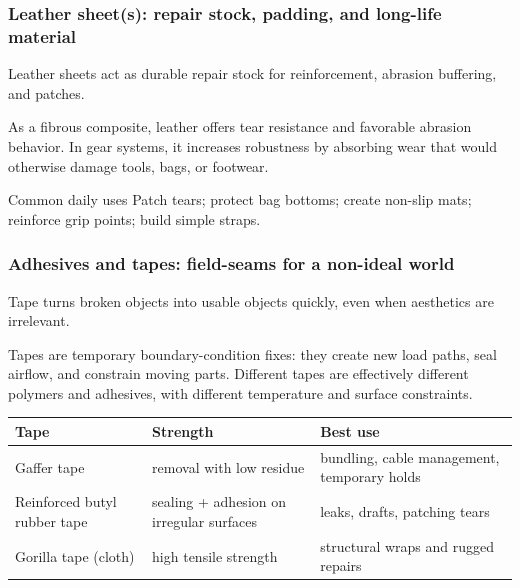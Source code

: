 \begin{frame}[t]
  \frametitle{Leather sheet(s): repair stock, padding, and long-life material}
  \justifying
   Leather sheets act as durable repair stock for reinforcement, abrasion buffering, and patches.

  \vspace{0.5em}
   As a fibrous composite, leather offers tear resistance and favorable abrasion behavior. In gear systems, it increases robustness by absorbing wear that would otherwise damage tools, bags, or footwear.

  \vspace{0.8em}
  \begin{block}{Common daily uses}
    Patch tears; protect bag bottoms; create non-slip mats; reinforce grip points; build simple straps.
  \end{block}
\end{frame}

\begin{frame}[t,shrink=2]
  \frametitle{Adhesives and tapes: field-seams for a non-ideal world}
  \justifying
   Tape turns broken objects into usable objects quickly, even when aesthetics are irrelevant.

  \vspace{0.5em}
   Tapes are temporary boundary-condition fixes: they create new load paths, seal airflow, and constrain moving parts. Different tapes are effectively different polymers and adhesives, with different temperature and surface constraints.

  \vspace{0.8em}
  \TableBodySize
  \begin{table}
    \centering
    \begin{tabularx}{\textwidth}{@{}lX X@{}}
      \toprule
      \textbf{Tape} & \textbf{Strength} & \textbf{Best use} \\
      \midrule
      Gaffer tape & removal with low residue & bundling, cable management, temporary holds \\
      Reinforced butyl rubber tape & sealing + adhesion on irregular surfaces & leaks, drafts, patching tears \\
      Gorilla tape (cloth) & high tensile strength & structural wraps and rugged repairs \\
      \bottomrule
    \end{tabularx}
  \end{table}
\end{frame}


